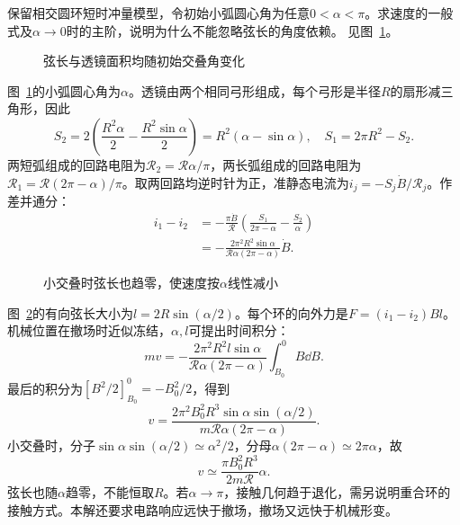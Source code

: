 \begin{exercise}[相交圆环几何角的变化]\label{ex:i4-h13}
保留相交圆环短时冲量模型，令初始小弧圆心角为任意$0<\alpha<\pi$。求速度的一般式及$\alpha\to0$时的主阶，说明为什么不能忽略弦长的角度依赖。 见图~\ref{fig:i4-h13-q}。
\end{exercise}

\begin{figure}[H]\centering
{}
\caption{弦长与透镜面积均随初始交叠角变化}\label{fig:i4-h13-q}
\end{figure}
\begin{solution}
图~\ref{fig:i4-h13-q}的小弧圆心角为$\alpha$。透镜由两个相同弓形组成，每个弓形是半径$R$的扇形减三角形，因此
\[
S_2=2\left(\frac{R^2\alpha}{2}-\frac{R^2\sin\alpha}{2}\right)
=R^2(\alpha-\sin\alpha),\quad S_1=2\pi R^2-S_2.
\]
两短弧组成的回路电阻为$\mathcal R_2=\mathcal R\alpha/\pi$，两长弧组成的回路电阻为$\mathcal R_1=\mathcal R(2\pi-\alpha)/\pi$。取两回路均逆时针为正，准静态电流为$i_j=-S_j\dot B/\mathcal R_j$。作差并通分：
\[
\begin{aligned}
i_1-i_2&=-\frac{\pi\dot B}{\mathcal R}
\left(\frac{S_1}{2\pi-\alpha}-\frac{S_2}{\alpha}\right)\\
&=-\frac{2\pi^2R^2\sin\alpha}
{\mathcal R\alpha(2\pi-\alpha)}\dot B.
\end{aligned}
\]
\begin{figure}[H]\centering
{}
\caption{小交叠时弦长也趋零，使速度按$\alpha$线性减小}\label{fig:i4-h13-s}
\end{figure}
图~\ref{fig:i4-h13-s}的有向弦长大小为$l=2R\sin(\alpha/2)$。每个环的向外力是$F=(i_1-i_2)Bl$。机械位置在撤场时近似冻结，$\alpha,l$可提出时间积分：
\[
mv=-\frac{2\pi^2R^2l\sin\alpha}
{\mathcal R\alpha(2\pi-\alpha)}
\int_{B_0}^0B\dd B.
\]
最后的积分为$[B^2/2]_{B_0}^0=-B_0^2/2$，得到
\[
\boxed{v=\frac{2\pi^2B_0^2R^3\sin\alpha\sin(\alpha/2)}
{m\mathcal R\alpha(2\pi-\alpha)}}.
\]
小交叠时，分子$\sin\alpha\sin(\alpha/2)\simeq\alpha^2/2$，分母$\alpha(2\pi-\alpha)\simeq2\pi\alpha$，故
\[
\boxed{v\simeq\frac{\pi B_0^2R^3}{2m\mathcal R}\alpha}.
\]
弦长也随$\alpha$趋零，不能恒取$R$。若$\alpha\to\pi$，接触几何趋于退化，需另说明重合环的接触方式。本解还要求电路响应远快于撤场，撤场又远快于机械形变。
\end{solution}

